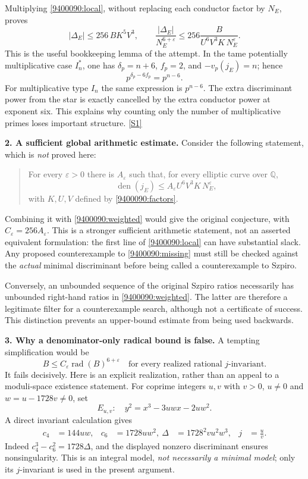\documentclass[11pt,a4paper]{article}
\newcommand{\Q}{\mathbb{Q}}
\newcommand{\sref}[2]{\hyperlink{source:#1:#2}{[S#2]}}
\numberwithin{equation}{section}
\begin{document}
Multiplying \eqref{9400090:local}, without replacing each conductor factor by
$N_E$, proves
\begin{equation}\label{9400090:weighted}
 |\Delta_E|\leq 256\,B K^5V^3,
 \qquad
 \frac{|\Delta_E|}{N_E^{6+\varepsilon}}
 \leq256\frac{B}{U^6V^3K\,N_E^\varepsilon}.
\end{equation}
This is the useful bookkeeping lemma of the attempt. In the tame
potentially multiplicative case $I_n^*$, one has
$\delta_p=n+6$, $f_p=2$, and $-v_p(j_E)=n$; hence
\[
 p^{\delta_p-6f_p}=p^{n-6}.
\]
For multiplicative type $I_n$ the same expression is $p^{n-6}$.
The extra discriminant power from the star is exactly cancelled by the
extra conductor power at exponent six. This explains why counting only the
number of multiplicative primes loses important structure.
\sref{9400090}{1}

\medskip
\textbf{2. A sufficient global arithmetic estimate.}
Consider the following statement, which is \emph{not} proved here:
\begin{quote}
For every $\varepsilon>0$ there is $A_\varepsilon$ such that, for every
elliptic curve over $\Q$,
\begin{equation}\label{9400090:missing}
 \operatorname{den}(j_E)\leq
 A_\varepsilon U^6V^3K\,N_E^\varepsilon,
\end{equation}
with $K,U,V$ defined by \eqref{9400090:factors}.
\end{quote}
Combining it with \eqref{9400090:weighted} would give the original conjecture,
with $C_\varepsilon=256A_\varepsilon$. This is a stronger sufficient
arithmetic statement, not an asserted equivalent formulation: the first
line of \eqref{9400090:local} can have substantial slack. Any proposed
counterexample to \eqref{9400090:missing} must still be checked against the
\emph{actual} minimal discriminant before being called a counterexample to
Szpiro.

Conversely, an unbounded sequence of the original Szpiro ratios necessarily
has unbounded right-hand ratios in \eqref{9400090:weighted}. The latter are
therefore a legitimate filter for a counterexample search, although not a
certificate of success. This distinction prevents an upper-bound estimate
from being used backwards.

\medskip
\textbf{3. Why a denominator-only radical bound is false.}
A tempting simplification would be
\begin{equation}\label{9400090:false}
 B\leq C_\varepsilon\operatorname{rad}(B)^{6+\varepsilon}
 \quad\text{for every realized rational $j$-invariant.}
\end{equation}
It fails decisively. Here is an explicit realization, rather than an appeal
to a moduli-space existence statement. For coprime integers $u,v$ with
$v>0$, $u\neq0$ and $w=u-1728v\neq0$, set
\[
 E_{u,v}:\quad y^2=x^3-3uwx-2uw^2.
\]
A direct invariant calculation gives
\begin{align}
 c_4&=144uw, &c_6&=1728uw^2,\
 \Delta&=1728^2vu^2w^3, &j&=\frac uv. \label{9400090:jmodel}
\end{align}
Indeed $c_4^3-c_6^2=1728\Delta$, and the displayed nonzero discriminant
ensures nonsingularity. This is an integral model, \emph{not necessarily a
minimal model}; only its $j$-invariant is used in the present argument.
\end{document}
